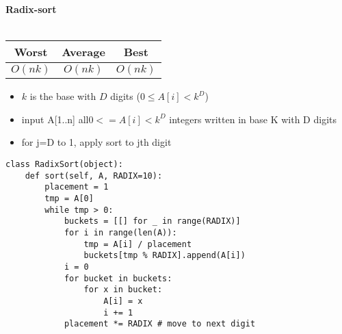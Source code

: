 \documentclass[11pt]{article}
\begin{document}
\textbf{Radix-sort} \\\\
\begin{tabular}{c|c|c}
    Worst & Average & Best \\
    \hline
    $O(nk)$ & $O(nk)$ & $O(nk)$
\end{tabular}
\begin{itemize}
    \item $k$ is the base with $D$ digits ($0 \leq A[i] < k^D$)
    \item input A[1..n] all$0 <= A[i] < k^D$ integers written in base K with D digits
    \item for j=D to 1, apply sort to jth digit
\end{itemize}
\begin{verbatim}
class RadixSort(object):
    def sort(self, A, RADIX=10):
        placement = 1
        tmp = A[0]
        while tmp > 0:
            buckets = [[] for _ in range(RADIX)]
            for i in range(len(A)):
                tmp = A[i] / placement
                buckets[tmp % RADIX].append(A[i])
            i = 0
            for bucket in buckets:
                for x in bucket:
                    A[i] = x
                    i += 1
            placement *= RADIX # move to next digit
\end{verbatim}
\end{document}
